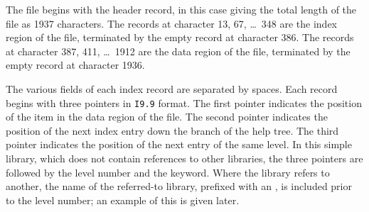 The file begins with the header record, in this case giving the
total length of the file as 1937 characters.
The records at character 13, 67, \ldots\ 348 are the index
region of the file, terminated by the empty record at character 386.
The records at character 387, 411, \ldots\ 1912 are the
data region of the file, terminated by the
empty record at character 1936.

The various fields of each index record are separated by spaces.
Each record begins with three pointers in {\tt I9.9} format.
The first pointer indicates the position of
the item in the data region of the file.  The second pointer
indicates the position of
the next index entry down the branch of the help tree.  The
third pointer indicates the position of the next entry of the
same level.
In this simple library, which does not contain references to
other libraries, the three pointers are followed by the
level number and the keyword.  Where the library refers to
another, the name of the referred-to library, prefixed with an ,
is included prior to the level number;  an example of this is
given later.


